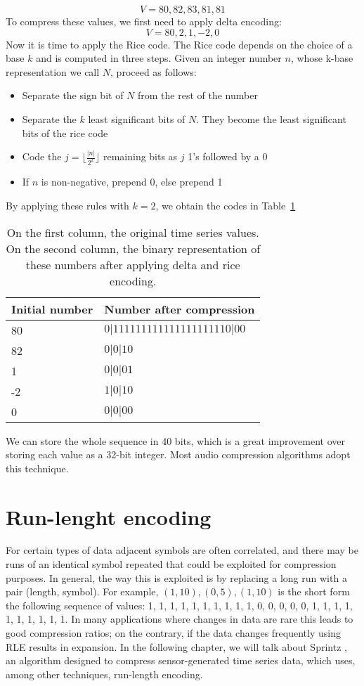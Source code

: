 $$V= 80, 82, 83, 81, 81$$
To compress these values, we first need to apply delta encoding:
$$V = 80, 2, 1, -2, 0$$
Now it is time to apply the Rice code. The Rice code depends on the choice of a base
$k$ and is computed in three steps. Given an integer number $n$, whose k-base representation
we call $N$, proceed as follows:
\begin{itemize}
	\item Separate the sign bit of $N$ from the rest of the number
	\item Separate the $k$ least significant bits of $N$. They become the least significant
    bits of the rice code
	\item Code the $j = \lfloor\frac{|n|}{2^k}\rfloor$ remaining bits as $j$ 1’s followed by a 0
	\item If $n$ is non-negative, prepend 0, else prepend 1
\end{itemize}
By applying these rules with $k = 2$, we obtain the codes in Table~\ref{tab:rice}
\begin{table}[]
\centering
\begin{tabular}{l|l}
\textbf{Initial number}     & \textbf{Number after compression} \\ 
\hline
80          & $0|111111111111111111110|00$ \\                    
82          & $0|0|10$                     \\ 
1           & $0|0|01$                     \\              
-2          & $1|0|10$                     \\           
0           & $0|0|00$                     \\            
\end{tabular}
\caption{On the first column, the original time series values.
On the second column, the binary representation of these numbers after applying delta and rice
encoding.}
\label{tab:rice}
\end{table}
We can store the whole sequence in 40 bits, which is a great improvement over storing each
value as a 32-bit integer. Most audio compression algorithms adopt this technique.

\section{Run-lenght encoding}
For certain types of data adjacent symbols are often correlated, and there may be runs of an
identical symbol repeated that could be exploited for compression purposes. In general, the way
this is exploited is by replacing a long run with a pair (length, symbol). For example,
$(1, 10), (0, 5), (1, 10)$ is the short form the following sequence of values:
1, 1, 1, 1, 1, 1, 1, 1, 1, 1, 0, 0, 0, 0, 0, 1, 1, 1, 1, 1, 1, 1, 1, 1, 1.
In many applications where changes in data are rare this leads to good compression ratios;
on the contrary, if the data changes frequently using RLE results in expansion. In the
following chapter, we will talk about Sprintz \cite{Blalock2018Sprintz},
an algorithm designed to compress sensor-generated time series data, which uses, among other
techniques, run-length encoding.

